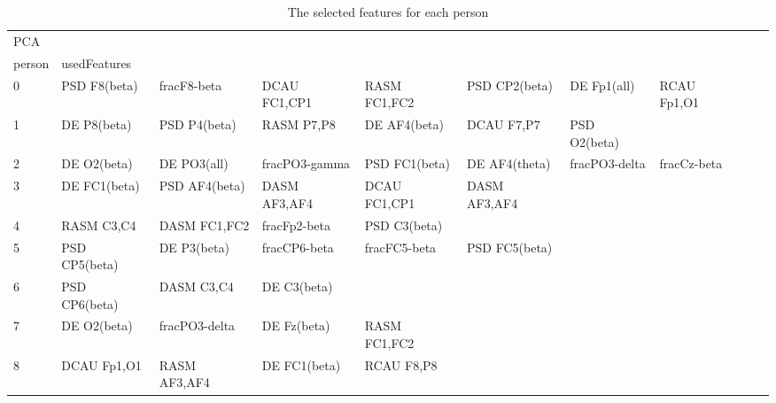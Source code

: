\begin{landscape}
\begin{table}[]
\centering
\caption{The selected features for each person}
\begin{tabular}{l|llllllll}
PCA      &                &                &                &                &                &                &               &                &               &               \\
person   & usedFeatures   &                &                &                &                &                &               &                &               &               \\
0        & PSD F8(beta)   & fracF8-beta    & DCAU FC1,CP1   & RASM FC1,FC2   & PSD CP2(beta)  & DE Fp1(all)    & RCAU Fp1,O1   &                &               &               \\
1        & DE P8(beta)    & PSD P4(beta)   & RASM P7,P8     & DE AF4(beta)   & DCAU F7,P7     & PSD O2(beta)   &               &                &               &               \\
2        & DE O2(beta)    & DE PO3(all)    & fracPO3-gamma  & PSD FC1(beta)  & DE AF4(theta)  & fracPO3-delta  & fracCz-beta   &                &               &               \\
3        & DE FC1(beta)   & PSD AF4(beta)  & DASM AF3,AF4   & DCAU FC1,CP1   & DASM AF3,AF4   &                &               &                &               &               \\
4        & RASM C3,C4     & DASM FC1,FC2   & fracFp2-beta   & PSD C3(beta)   &                &                &               &                &               &               \\
5        & PSD CP5(beta)  & DE P3(beta)    & fracCP6-beta   & fracFC5-beta   & PSD FC5(beta)  &                &               &                &               &               \\
6        & PSD CP6(beta)  & DASM C3,C4     & DE C3(beta)    &                &                &                &               &                &               &               \\
7        & DE O2(beta)    & fracPO3-delta  & DE Fz(beta)    & RASM FC1,FC2   &                &                &               &                &               &               \\
8        & DCAU Fp1,O1    & RASM AF3,AF4   & DE FC1(beta)   & RCAU F8,P8     &                &                &               &                &               &               \\

\end{tabular}
\end{table}
\end{landscape}
